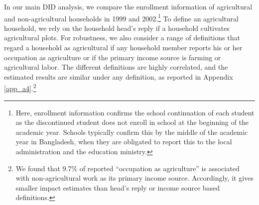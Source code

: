 \documentclass[12pt,letterpaper]{article}\usepackage[margin=1in]{geometry}
\newcommand{\0}{\ensuremath{\mbox{\boldmath $0$}}}
\begin{document}
In our main DID analysis, we compare the enrollment information of agricultural and non-agricultural households in 1999 and 2002.\footnote{Here, enrollment information confirms the school continuation of each student as the discontinued student does not enroll in school at the beginning of the academic year. Schools typically confirm this by the middle of the academic year in Bangladesh, when they are obligated to report this to the local administration and the education ministry. } To define an agricultural household, we rely on the household head's reply if a household cultivates agricultural plots. For robustness, we also consider a range of definitions that regard a household as agricultural if any household member reports his or her occupation as agriculture or if the primary income source is farming or agricultural labor. The different definitions are highly correlated, and the estimated results are similar under any definition, as reported in Appendix \ref{app_a4}.\footnote{We found that 9.7\% of reported ``occupation as agriculture'' is associated with non-agricultural work as its primary income source. Accordingly, it gives smaller impact estimates than head's reply or income source based definitions. }
\end{document}
